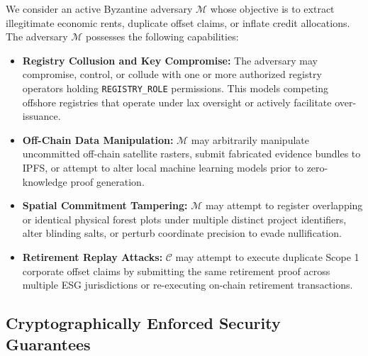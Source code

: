 \documentclass[preprint,12pt]{elsarticle}
\begin{document}
We consider an active Byzantine adversary $\mathcal{M}$ whose objective is to extract illegitimate economic rents, duplicate offset claims, or inflate credit allocations. The adversary $\mathcal{M}$ possesses the following capabilities:
\begin{itemize}
\item \textbf{Registry Collusion and Key Compromise:} The adversary may compromise, control, or collude with one or more authorized registry operators holding \texttt{REGISTRY\_ROLE} permissions. This models competing offshore registries that operate under lax oversight or actively facilitate over-issuance.
\item \textbf{Off-Chain Data Manipulation:} $\mathcal{M}$ may arbitrarily manipulate uncommitted off-chain satellite rasters, submit fabricated evidence bundles to IPFS, or attempt to alter local machine learning models prior to zero-knowledge proof generation.
\item \textbf{Spatial Commitment Tampering:} $\mathcal{M}$ may attempt to register overlapping or identical physical forest plots under multiple distinct project identifiers, alter blinding salts, or perturb coordinate precision to evade nullification.
\item \textbf{Retirement Replay Attacks:} $\mathcal{C}$ may attempt to execute duplicate Scope 1 corporate offset claims by submitting the same retirement proof across multiple ESG jurisdictions or re-executing on-chain retirement transactions.
\end{itemize}

\subsection{Cryptographically Enforced Security Guarantees}
\end{document}

